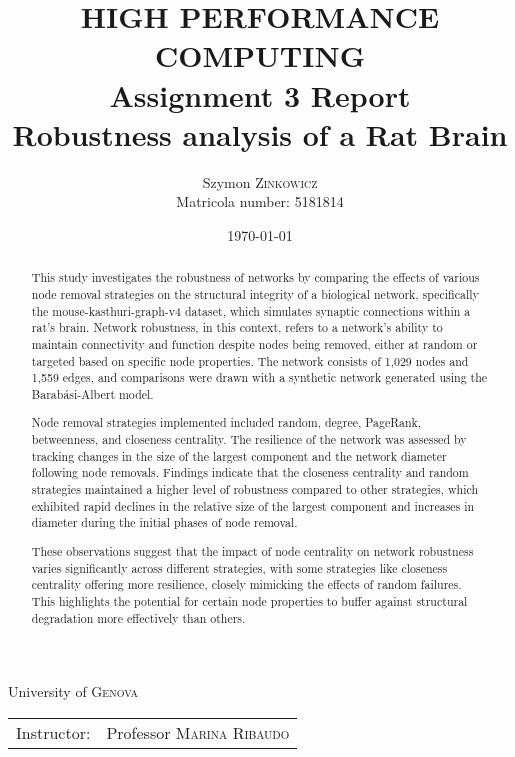 \documentclass[
	report, %
	11pt, %
]{CSUniSchoolLabReport}
\newcounter{ct}
\begin{document}
\title{HIGH PERFORMANCE COMPUTING \\
\large Assignment 3 Report \\
		Robustness analysis of a Rat Brain} %
\author{Szymon \textsc{Zinkowicz} \\ Matricola number: 5181814} %
\date{\today} %

\maketitle %
\thispagestyle{empty}

\begin{center}
	\vspace{\fill}
	University of \textsc{Genova} \\
	\begin{tabular}{l r}
		Instructor: & Professor \textsc{Marina Ribaudo}
	\end{tabular}
\end{center}
\pagebreak



\begin{abstract}
	\thispagestyle{empty}This study investigates the robustness of networks by comparing the effects of various node removal strategies on the structural integrity of a biological network, specifically the mouse-kasthuri-graph-v4 dataset, which simulates synaptic connections within a rat's brain. Network robustness, in this context, refers to a network's ability to maintain connectivity and function despite nodes being removed, either at random or targeted based on specific node properties. The network consists of 1,029 nodes and 1,559 edges, and comparisons were drawn with a synthetic network generated using the Barabási-Albert model.\par
	Node removal strategies implemented included random, degree, PageRank, betweenness, and closeness centrality. The resilience of the network was assessed by tracking changes in the size of the largest component and the network diameter following node removals. Findings indicate that the closeness centrality and random strategies maintained a higher level of robustness compared to other strategies, which exhibited rapid declines in the relative size of the largest component and increases in diameter during the initial phases of node removal.\par
	These observations suggest that the impact of node centrality on network robustness varies significantly across different strategies, with some strategies like closeness centrality offering more resilience, closely mimicking the effects of random failures. This highlights the potential for certain node properties to buffer against structural degradation more effectively than others.
\end{abstract}
\pagebreak
\end{document}
